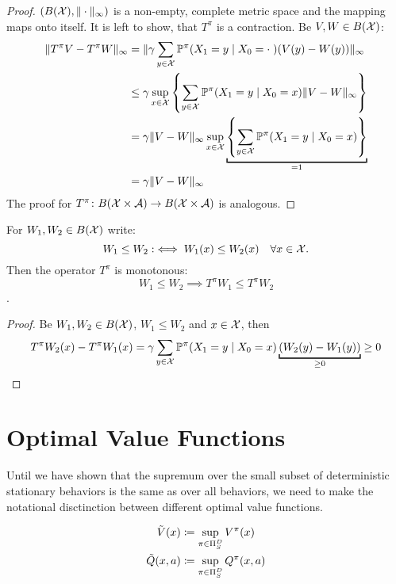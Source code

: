 \begin{proof}
\((B(\mathcal{X}), \|\cdot\|_\infty)\) is a non-empty, complete metric space and the mapping maps onto itself. It is left to show, that \(T^\pi\) is a contraction. Be \(V,W\in B(\mathcal{X})\):
\begin{align*}
	\|T^\pi V -T^\pi W\|_\infty 
	&=\|\gamma\sum_{y\in\cX} \Pr^\pi(X_1=y\mid X_0=\cdot\;) (V(y)-W(y))\|_\infty\\
	&\le\gamma \sup_{x\in\cX}\left\{ \sum_{y\in\cX} 
	\Pr^\pi(X_1=y\mid X_0=x) \|V-W\|_\infty \right\}\\
	&=\gamma \|V-W\|_\infty  \sup_{x\in\cX}\underbracket[1pt]{
		\left\{ \sum_{y\in\cX} \Pr^\pi(X_1=y\mid X_0=x) \right\}
	}_{=1}\\
	&=\gamma \|V-W\|_\infty
\end{align*}
The proof for \(T^\pi\colon B(\mathcal{X}\times\mathcal{A})\to B(\mathcal{X}\times\mathcal{A})\) is analogous.
\end{proof}

\begin{lemma}\label{properties T^pi} For \(W_1,W_2\in B(\mathcal{X})\) write:
	\[
		W_1 \le W_2 :\iff  W_1(x)\le W_2(x) \quad \forall x\in\mathcal{X}.
	\]
	Then the operator \(T^\pi\) is monotonous: 
		\[W_1\le W_2 \implies T^\pi W_1\le T^\pi W_2\].
\end{lemma}

\begin{proof}
 Be \(W_1,W_2\in B(\mathcal{X})\), \(W_1\le W_2\) and \(x\in\mathcal{X}\), then
\[
	T^\pi W_2 (x) - T^\pi W_1(x) 
	= \gamma \sum_{y\in\cX} \Pr^\pi(X_1=y\mid X_0=x) \underbracket[1pt]{
		(W_2(y)-W_1(y))
	}_{\ge 0} \ge 0 \qedhere
\]
\end{proof}

\section{Optimal Value Functions}
Until we have shown that the supremum over the small subset of deterministic stationary behaviors is the same as over all behaviors, we need to make the notational disctinction between different optimal value functions.

\begin{definition}
\begin{align*}
	\tilde{V}(x)&\coloneqq \sup_{\pi\in\Pi_S^D} V^\pi(x)\\
	\tilde{Q}(x,a)&\coloneqq \sup_{\pi\in\Pi_S^D} Q^\pi(x,a)
\end{align*}
\end{definition}

